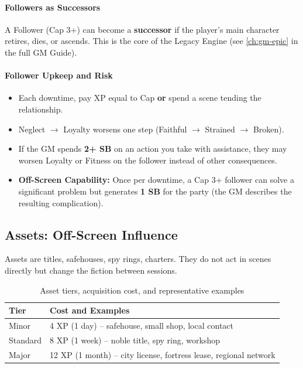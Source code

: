 \paragraph{Followers as Successors}
A Follower (Cap 3+) can become a \textbf{successor} if the player's main character retires, dies, or ascends. This is the core of the Legacy Engine (see \ref{ch:gm-epic} in the full GM Guide).

\paragraph{Follower Upkeep and Risk}
\begin{itemize}
  \item Each downtime, pay XP equal to Cap \textbf{or} spend a scene tending the relationship.
  \item Neglect $\rightarrow$ Loyalty worsens one step (Faithful $\rightarrow$ Strained $\rightarrow$ Broken).
  \item If the GM spends \textbf{2+ SB} on an action you take with assistance, they may worsen Loyalty or Fitness on the follower instead of other consequences.
  \item \textbf{Off-Screen Capability:} Once per downtime, a Cap 3+ follower can solve a significant problem but generates \textbf{1 SB} for the party (the GM describes the resulting complication).
\end{itemize}

\subsection{Assets: Off-Screen Influence}
\label{subsec:assets-gm}

Assets are titles, safehouses, spy rings, charters. They do not act in scenes directly but change the fiction between sessions.

\begin{table}[htbp]
\centering
\small
\begin{tabularx}{\linewidth}{lX}
\toprule
\textbf{Tier} & \textbf{Cost and Examples} \\
\midrule
Minor & 4 XP (1 day) -- safehouse, small shop, local contact \\
Standard & 8 XP (1 week) -- noble title, spy ring, workshop \\
Major & 12 XP (1 month) -- city license, fortress lease, regional network \\
\bottomrule
\end{tabularx}
\caption{Asset tiers, acquisition cost, and representative examples}
\label{tab:asset-tiers}
\end{table}

